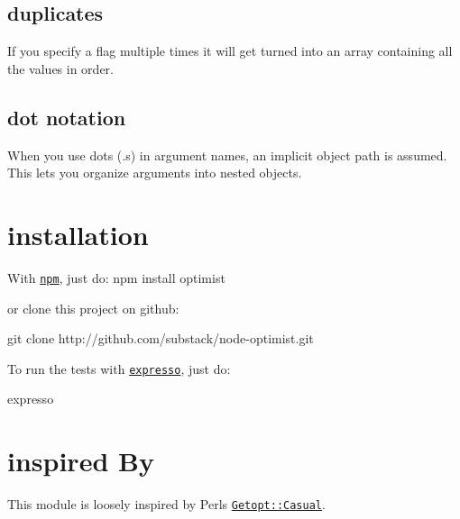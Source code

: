\subsection*{duplicates }

If you specify a flag multiple times it will get turned into an array containing all the values in order. 


\subsection*{dot notation }

When you use dots ({\ttfamily .}s) in argument names, an implicit object path is assumed. This lets you organize arguments into nested objects. 


\section*{installation }

With \href{http://github.com/isaacs/npm}{\tt npm}, just do\+: npm install optimist

or clone this project on github\+: \begin{DoxyVerb}git clone http://github.com/substack/node-optimist.git
\end{DoxyVerb}


To run the tests with \href{http://github.com/visionmedia/expresso}{\tt expresso}, just do\+: \begin{DoxyVerb}expresso
\end{DoxyVerb}


\section*{inspired By }

This module is loosely inspired by Perl\textquotesingle{}s \href{http://search.cpan.org/~photo/Getopt-Casual-0.13.1/Casual.pm}{\tt Getopt\+::\+Casual}. 